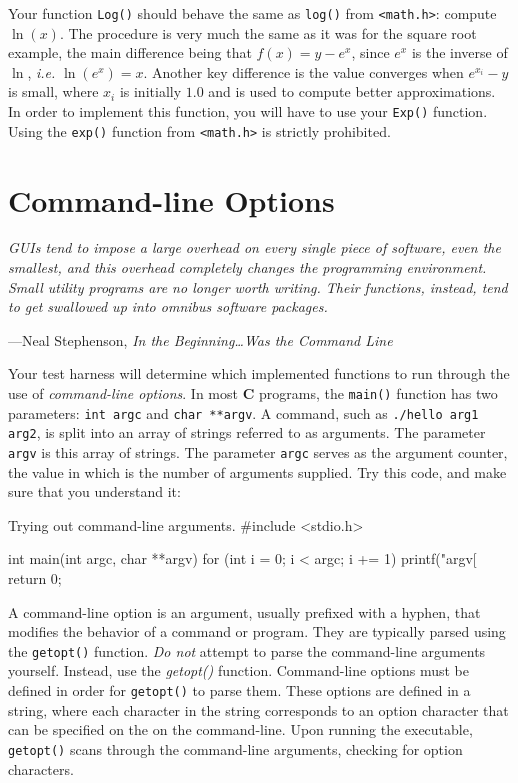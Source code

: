 \documentclass[11pt]{article}
\begin{document}
Your function \texttt{Log()} should behave the same as \texttt{log()} from
\texttt{<math.h>}: compute $\ln(x)$. The procedure is very much the same as it
was for the square root example, the main difference being that $f(x) = y -
e^x$, since $e^x$ is the inverse of $\ln$, \textit{i.e.} $\ln(e^x) = x$. Another
key difference is the value converges when $e^{x_{i}} - y$ is small, where
$x_{i}$ is initially $1.0$ and is used to compute better approximations. In
order to implement this function, you will have to use your \texttt{Exp()}
function. Using the \texttt{exp()} function from \texttt{<math.h>} is strictly
prohibited.

\section{Command-line Options}
\textwidth
\epigraph{\emph{GUIs tend to impose a large overhead on every single piece of
    software, even the smallest, and this overhead completely changes the
    programming environment. Small utility programs are no longer worth writing.
    Their functions, instead, tend to get swallowed up into omnibus software
packages.}}{---Neal Stephenson, \emph{In the Beginning\ldots Was the Command
Line}}

Your test harness will determine which implemented functions to run through the
use of \emph{command-line options}. In most \textbf{C} programs, the
\texttt{main()} function has two parameters: \texttt{int argc} and \texttt{char
**argv}. A command, such as \texttt{./hello arg1 arg2}, is split into an array
of strings referred to as arguments. The parameter \texttt{argv} is this array
of strings. The parameter \texttt{argc} serves as the argument counter, the
value in which is the number of arguments supplied. Try this code, and make sure
that you understand it:

\begin{codelisting}{Trying out command-line arguments.}
#include <stdio.h>

int main(int argc, char **argv) {
    for (int i = 0; i < argc; i += 1) {
        printf("argv[%
    }
    return 0;
}
\end{codelisting}

A command-line option is an argument, usually prefixed with a hyphen,
that modifies the behavior of a command or program. They are typically parsed
using the \texttt{getopt()} function. \emph{Do not} attempt to parse the command-line
arguments yourself. Instead, use the \textit{getopt()} function. Command-line options
must be defined in order for \texttt{getopt()} to parse them. These options are defined
in a string, where each character in the string corresponds to an option character
that can be specified on the on the command-line. Upon running the executable,
\texttt{getopt()} scans through the command-line arguments, checking for option
characters.
\end{document}
